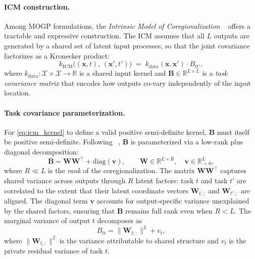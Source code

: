 \documentclass[11pt]{article}
\begin{document}
\paragraph{ICM construction.}
Among MOGP formulations, the \emph{Intrinsic Model of Coregionalization}
~\parencite{goovaerts1997geostatistics, alvarez2012kernels} offers a tractable and
expressive construction. The ICM assumes that all $L$ outputs are generated by a
shared set of latent input processes, so that the joint covariance factorizes as a
Kronecker product:
%
\begin{equation}
    k_{\mathrm{ICM}}\bigl((\mathbf{x}, t),\, (\mathbf{x}', t')\bigr)
    \;=\;
    k_{\mathrm{data}}(\mathbf{x}, \mathbf{x}') \cdot B_{tt'},
    \label{eq:icm_kernel}
\end{equation}
%
where $k_{\mathrm{data}} : \mathcal{X} \times \mathcal{X} \to \mathbb{R}$ is a
shared input kernel and $\mathbf{B} \in \mathbb{R}^{L \times L}$ is a
\emph{task covariance matrix} that encodes how outputs co-vary independently of
the input location.

\paragraph{Task covariance parameterization.}
For \eqref{eq:icm_kernel} to define a valid positive semi-definite kernel, $\mathbf{B}$
must itself be positive semi-definite. Following ~\parencite{bonilla2008multitask}, $\mathbf{B}$
is parameterized via a low-rank plus diagonal decomposition:
%
\begin{equation}
    \mathbf{B} = \mathbf{W}\mathbf{W}^\top + \mathrm{diag}(\mathbf{v}),
    \qquad
    \mathbf{W} \in \mathbb{R}^{L \times R},\quad \mathbf{v} \in \mathbb{R}^L_{>0},
    \label{eq:B_decomp}
\end{equation}
%
where $R \ll L$ is the \emph{rank} of the coregionalization. The matrix
$\mathbf{W}\mathbf{W}^\top$ captures shared variance across outputs through $R$
latent factors: task $t$ and task $t'$ are correlated to the extent that their
latent coordinate vectors $\mathbf{W}_{t,:}$ and $\mathbf{W}_{t',:}$ are aligned.
The diagonal term $\mathbf{v}$ accounts for output-specific variance unexplained by
the shared factors, ensuring that $\mathbf{B}$ remains full rank even when $R < L$.
The marginal variance of output $t$ decomposes as
%
\begin{equation}
    B_{tt} = \|\mathbf{W}_{t,:}\|^2 + v_t,
\end{equation}
%
where $\|\mathbf{W}_{t,:}\|^2$ is the variance attributable to shared structure and
$v_t$ is the private residual variance of task $t$.
\end{document}
